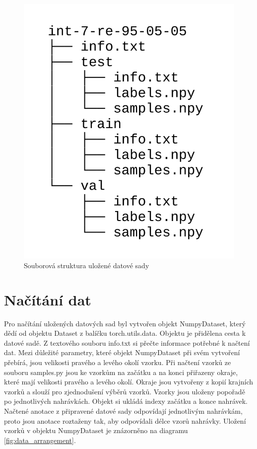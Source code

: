 \documentclass[FM,BP]{tulthesis}
\begin{document}
\begin{figure}[h]
\centerline{\includegraphics[scale=.22]{dataset_file_structure.png}}
\caption{Souborová struktura uložené datové sady}
\label{fig:file_structure}
\end{figure}
\FloatBarrier

\section{Načítání dat}
Pro načítání uložených datových sad byl vytvořen objekt NumpyDataset, který dědí od objektu Dataset z balíčku torch.utils.data. Objektu je přidělena cesta k datové sadě. Z textového souboru info.txt si přečte informace potřebné k načtení dat. Mezi důležité parametry, které objekt NumpyDataset při svém vytvoření přebírá, jsou velikosti pravého a levého okolí vzorku. Při načtení vzorků ze souboru samples.py jsou ke vzorkům na začátku a na konci přiřazeny okraje, které mají velikosti pravého a levého okolí. Okraje jsou vytvořeny z kopií krajních vzorků a slouží pro zjednodušení výběrů vzorků. Vzorky jsou uloženy popořadě po jednotlivých nahrávkách. Objekt si ukládá indexy začátku a konce nahrávek. Načtené anotace z připravené datové sady odpovídají jednotlivým nahrávkám, proto jsou anotace roztaženy tak, aby odpovídali délce vzorů nahrávky. Uložení vzorků v objektu NumpyDataset je znázorněno na diagramu \ref{fig:data_arrangement}.
\end{document}
